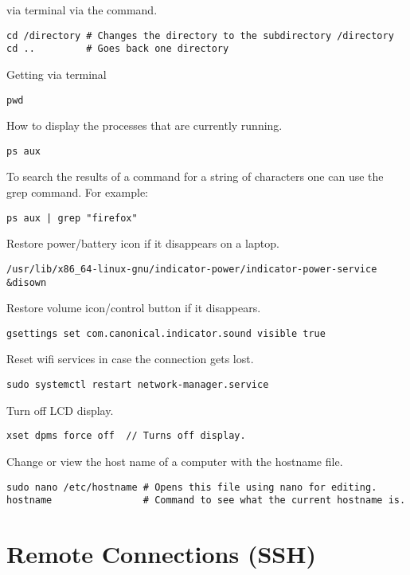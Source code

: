  via terminal via the command.
\begin{lstlisting}
cd /directory # Changes the directory to the subdirectory /directory
cd ..         # Goes back one directory
\end{lstlisting}

Getting  via terminal
\begin{lstlisting}
pwd
\end{lstlisting}

How to display the processes that are currently running.
\begin{lstlisting}
ps aux
\end{lstlisting}

To search the results of a command for a string of characters one can use the grep command. For example:
\begin{lstlisting}
ps aux | grep "firefox"
\end{lstlisting}

Restore power/battery icon if it disappears on a laptop.
\begin{lstlisting}
/usr/lib/x86_64-linux-gnu/indicator-power/indicator-power-service &disown 
\end{lstlisting}

Restore volume icon/control button if it disappears.
\begin{lstlisting}
gsettings set com.canonical.indicator.sound visible true
\end{lstlisting}

Reset wifi services in case the connection gets lost.
\begin{lstlisting}
sudo systemctl restart network-manager.service
\end{lstlisting}

Turn off LCD display.
\begin{lstlisting}
xset dpms force off  // Turns off display.
\end{lstlisting}

Change or view the host name of a computer with the hostname file.
\begin{lstlisting}
sudo nano /etc/hostname # Opens this file using nano for editing.
hostname                # Command to see what the current hostname is.
\end{lstlisting}




\section{Remote Connections (SSH)}


